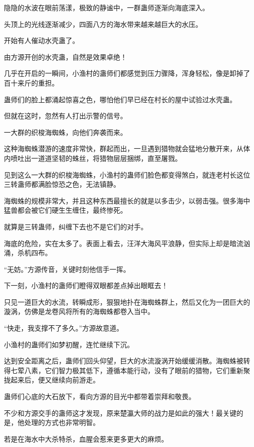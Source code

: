 
\begin{this_body}

隐隐的水波在眼前荡漾，极致的静谧中，一群蛊师逐渐向海底深入。

头顶上的光线逐渐减少，四面八方的海水带来越来越巨大的水压。

开始有人催动水壳蛊了。

由方源开创的水壳蛊，自然是效果卓绝！

几乎在开启的一瞬间，小渔村的蛊师们都感觉到压力骤降，浑身轻松，像是卸掉了百十来斤的重担。

蛊师们的脸上都涌起惊喜之色，哪怕他们早已经在村长的屋中试验过水壳蛊。

但就在这时，忽然有人打出示警的信号。

一大群的织梭海蜘蛛，向他们奔袭而来。

这种海蜘蛛潜游的速度非常快，群起而出，一旦遇到猎物就会猛地分散开来，从体内喷吐出一道道坚韧的蛛丝，将猎物层层捆绑，直至屠戮。

见到这么一大群的织梭海蜘蛛，小渔村的蛊师们脸色都变得煞白，就连老村长这位三转蛊师都满脸惊恐之色，无法镇静。

海蜘蛛的规模非常大，并且这种东西最擅长的就是以多击少，以弱击强。很多海中猛兽都会被它们硬生生缠住，最终惨死。

就算是三转蛊师，纠缠下去也不是它们的对手。

海底的危险，实在太多了。表面上看去，汪洋大海风平浪静，但实际上却是暗流汹涌，杀机四布。

“无妨。”方源传音，关键时刻他信手一挥。

下一刻，小渔村的蛊师们瞪得双眼都差点掉出眼眶去！

只见一道巨大的水流，转瞬成形，狠狠地扑在海蜘蛛群上，然后又化为一团巨大的漩涡，仿佛是龙卷风将所有的海蜘蛛都卷入当中。

“快走，我支撑不了多久。”方源故意道。

小渔村的蛊师们如梦初醒，连忙继续下沉。

达到安全距离之后，蛊师们回头仰望，巨大的水流漩涡开始缓缓消散。海蜘蛛被转得七荤八素，它们智力极其低下，遵循本能行动，没有了眼前的猎物，它们重新聚拢起来后，便又继续向前游走。

蛊师们心底的大石放下，看向方源的目光中都带着崇拜和敬畏。

不少和方源交手的蛊师这才发现，原来楚瀛大师的战力是如此的强大！最关键的是，他处理的方式也非常明智。

若是在海水中大杀特杀，血腥会惹来更多更大的麻烦。


\end{this_body}
